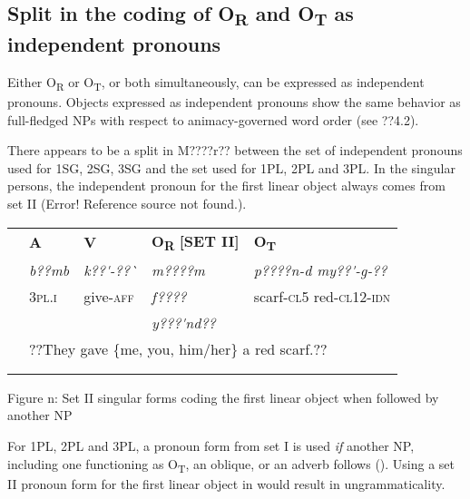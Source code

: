 \documentclass[output=paper]{langsci/langscibook}
\begin{document}
\subsection{Split in the coding of O\textsubscript{R} and O\textsubscript{T} as independent pronouns}

Either O\textsubscript{R} or O\textsubscript{T}, or both simultaneously, can be expressed as independent pronouns. Objects expressed as independent pronouns show the same behavior as full-fledged NPs with respect to animacy-governed word order (see ??4.2). 

There appears to be a split in M????r?? between the set of independent pronouns used for 1SG, 2SG, 3SG and the set used for 1PL, 2PL and 3PL. In the singular persons, the independent pronoun for the first linear object always comes from set II (Error! Reference source not found.). 

\begin{tabularx}{\textwidth}{XXXXX} & \textbf{A} & \textbf{V} & \textbf{O}\textbf{\textsubscript{R}}\textbf{ [SET II]} & \textbf{O}\textbf{\textsubscript{T}}\\
\lsptoprule
& \textit{b??mb} & \textit{k??\'{ }-??\`{ }} & \textit{m????m} & \textit{p????n-d      my??\'{ }-g-??}\\
& 3\textsc{pl.i} & give-\textsc{aff} & \textit{f????} & scarf-\textsc{cl5 } red-\textsc{cl12-idn}\\
&  &  & \textit{y???\'{ }nd??} & \\
& \multicolumn{4}{l}{??They gave \{me, you, him/her\} a red scarf.??}\\
& \multicolumn{4}{l}{}\\
\lspbottomrule
\end{tabularx}
\begin{table}\caption{
Figure n: Set II singular forms coding the first linear object when followed by another NP
}\end{table}

For 1PL, 2PL and 3PL, a pronoun form from set I is used \textit{if} another NP, including one functioning as O\textsubscript{T}, an oblique, or an adverb follows (). Using a set II pronoun form for the first linear object in  would result in ungrammaticality.
\end{document}
